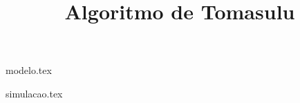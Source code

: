 \documentclass[aspectratio=169]{beamer}
\title{Algoritmo de Tomasulu}
\begin{document}
    \begin{frame}

    \titlepage

    \end{frame}

    {modelo.tex}

    {simulacao.tex}

\end{document}
